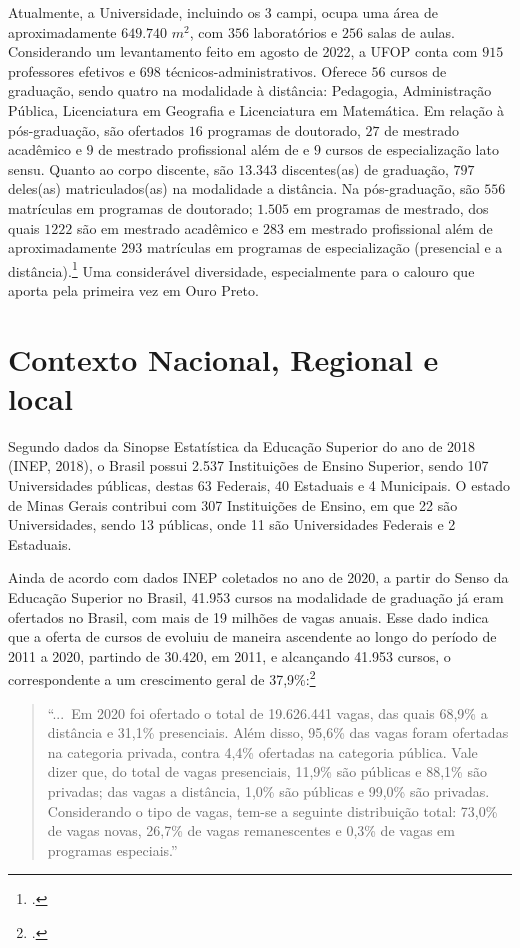 \documentclass[
	12pt,				%
	openright,			%
	oneside,			%
	a4paper,			%
	english,			%
	brazil				%
	]{abntex2}
\begin{document}
Atualmente, a Universidade, incluindo os 3 campi, ocupa uma área de aproximadamente $649.740$ $m^2$, com $356$ laboratórios e $256$ salas de aulas. Considerando um levantamento feito em agosto de 2022, a UFOP conta com $915$ professores efetivos e $698$ técnicos-administrativos. Oferece $56$ cursos de graduação, sendo quatro na modalidade à distância: Pedagogia, Administração Pública, Licenciatura em Geografia e Licenciatura em Matemática. Em relação à pós-graduação, são ofertados $16$ programas de doutorado, $27$ de mestrado acadêmico e $9$ de mestrado profissional além de e $9$ cursos de especialização lato sensu. Quanto ao corpo discente, são $13.343$ discentes(as) de graduação, $797$ deles(as) matriculados(as) na modalidade a distância. Na pós-graduação, são $556$ matrículas em programas de doutorado; $1.505$ em programas de mestrado, dos quais $1222$ são em mestrado acadêmico e $283$ em mestrado profissional além de aproximadamente $293$ matrículas em programas de especialização (presencial e a distância).\footcite[De acordo com o plano de desenvolvimento institucional (PDI) aprovado para o período $(2016-2025)$, por meio da resolução CUNI 1793 de 14 de dezembro de 2015. Ver em][]{PDI-UFOP} Uma considerável diversidade, especialmente para o calouro que aporta pela primeira vez em Ouro Preto.

\section{Contexto Nacional, Regional e local}
%
Segundo dados da Sinopse Estatística da Educação Superior do ano de 2018 (INEP, 2018), o Brasil possui 2.537 Instituições de Ensino Superior, sendo 107 Universidades públicas, destas 63 Federais, 40 Estaduais e 4 Municipais. O estado de Minas Gerais contribui com 307 Instituições de Ensino, em que 22 são Universidades, sendo 13 públicas, onde 11 são Universidades Federais e 2 Estaduais.

Ainda de acordo com dados INEP coletados no ano de 2020, a partir do Senso da Educação Superior no Brasil, 41.953 cursos na modalidade de graduação já eram ofertados no Brasil, com mais de 19 milhões de vagas anuais. Esse dado indica que a oferta de cursos de evoluiu de maneira ascendente ao longo do período de 2011 a 2020, partindo de 30.420, em 2011, e alcançando 41.953 cursos, o correspondente a um crescimento geral de 37,9\%:\footcite[][p.~17]{senso-inep}
\begin{quotation}
``...~Em 2020 foi ofertado o total de 19.626.441 vagas, das quais 68,9\% a distância e 31,1\% presenciais. Além disso, 95,6\% das vagas foram ofertadas na categoria privada, contra 4,4\% ofertadas na categoria pública. Vale dizer que, do total de vagas presenciais, 11,9\% são públicas e 88,1\% são privadas; das vagas a distância, 1,0\% são públicas e 99,0\% são privadas. Considerando o tipo de vagas, tem-se a seguinte distribuição total: 73,0\% de vagas novas, 26,7\% de vagas remanescentes e 0,3\% de vagas em programas especiais.''
\end{quotation}
\end{document}
